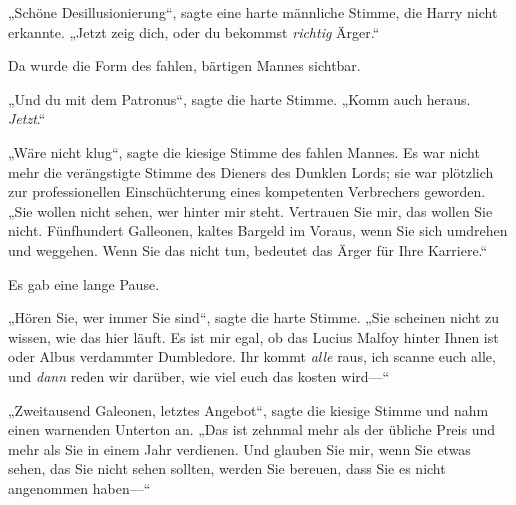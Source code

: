 „Schöne Desillusionierung“, sagte eine harte männliche Stimme, die Harry nicht erkannte. „Jetzt zeig dich, oder du bekommst \emph{richtig} Ärger.“

Da wurde die Form des fahlen, bärtigen Mannes sichtbar.

„Und du mit dem Patronus“, sagte die harte Stimme. „Komm auch heraus. \emph{Jetzt}.“

„Wäre nicht klug“, sagte die kiesige Stimme des fahlen Mannes. Es war nicht mehr die verängstigte Stimme des Dieners des Dunklen Lords; sie war plötzlich zur professionellen Einschüchterung eines kompetenten Verbrechers geworden. „Sie wollen nicht sehen, wer hinter mir steht. Vertrauen Sie mir, das wollen Sie nicht. Fünfhundert Galleonen, kaltes Bargeld im Voraus, wenn Sie sich umdrehen und weggehen. Wenn Sie das nicht tun, bedeutet das Ärger für Ihre Karriere.“

Es gab eine lange Pause.

„Hören Sie, wer immer Sie sind“, sagte die harte Stimme. „Sie scheinen nicht zu wissen, wie das hier läuft. Es ist mir egal, ob das Lucius Malfoy hinter Ihnen ist oder Albus verdammter Dumbledore. Ihr kommt \emph{alle} raus, ich scanne euch alle, und \emph{dann} reden wir darüber, wie viel euch das kosten wird—“

„Zweitausend Galeonen, letztes Angebot“, sagte die kiesige Stimme und nahm einen warnenden Unterton an. „Das ist zehnmal mehr als der übliche Preis und mehr als Sie in einem Jahr verdienen. Und glauben Sie mir, wenn Sie etwas sehen, das Sie nicht sehen sollten, werden Sie bereuen, dass Sie es nicht angenommen haben—“

